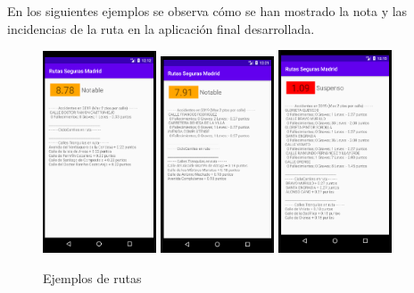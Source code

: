 En los siguientes ejemplos se observa cómo se han mostrado la nota y las incidencias de la ruta en la aplicación final desarrollada.


\clearpage
\begin{figure}[h]
	\centering
	\includegraphics[angle=0, width=0.3\textwidth]{images/android/captura2.png}  
	\includegraphics[angle=0, width=0.3\textwidth]{images/android/captura4.png} 
	\includegraphics[angle=0, width=0.3\textwidth]{images/android/captura3.png}  
	
	\caption{Ejemplos de rutas}
	\label{fig:diagramaOntologAccid}
\end{figure}

